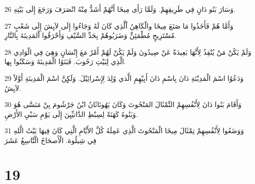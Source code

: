 \par 26 وَسَارَ بَنُو دَانٍ فِي طَرِيقِهِمْ. وَلَمَّا رَأَى مِيخَا أَنَّهُمْ أَشَدُّ مِنْهُ انْصَرَفَ وَرَجَعَ إِلَى بَيْتِهِ.
\par 27 وَأَمَّا هُمْ فَأَخَذُوا مَا صَنَعَ مِيخَا والْكَاهِنُ اْلَّذِي كَانَ لَهُ وَجَاءُوا إِلَى لاَيِشَ إِلَى شَعْبٍ مُسْتَرِيحٍ مُطْمَئِنٍّ وَضَرَبُوهُمْ بِحَدِّ السَّيْفِ وَأَحْرَقُوا اْلمَدِينَةَ بِالنَّارِ.
\par 28 وَلَمْ يَكُنْ مَنْ يُنْقِذُ لِأَنَّهَا بَعِيدَةٌ عَنْ صِيدُونَ وَلَمْ يَكُنْ لَهُمْ أَمْرٌ مَعَ إِنْسَانٍ وَهِيَ فِي الْوَادِي الَّذِي لِبَيْتِ رَحُوبَ. فَبَنَوُا الْمَدِينَةَ وَسَكَنُوا بِها.
\par 29 وَدَعُوُا اسْمَ الْمَدِيْنَةِ دَانَ بِاسْمِ دَانَ أَبِيْهِمِ الَّذي وُلِدَ لِإِسْرائِيْلَ. وَلَكٍِنَّ اسْمَ الْمَدِينَةِ أَوَّلاً لاَيِشُ.
\par 30 وَأَقَامَ بَنُوا دَانَ لِأَنْفُسِهِمْ التِّمْثَالَ المَنْحُوتَ وَكَانَ يَهُونَاثَانُ ابْنُ جَرْشُومَ بِنْ مَنَسَّى هُوَ وَبَنُوهُ كَهَنَةً لِسِبْطِ الدَّانيِّيِنَ إِلَى يَوْمِ سَبْيِ الأَرْضِ.
\par 31 وَوَضَعُوا لِأَنْفُسِهِمْ تِمْثَالَ مِيخَا الْمَنْحُوتَ الَّذِي عَمِلَهُ كُلَّ الأَيَّامِ الَّتِي كَانَ فِيهَا بَيْتُ الَّلهِ فِي شِيلُوهَ. الْأَصحَاحُ الْتَّاسِعُ عَشَرَ

\chapter{19}

